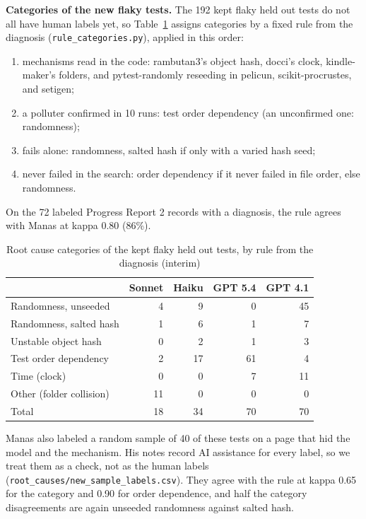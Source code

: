 \textbf{Categories of the new flaky tests.} The 192 kept flaky held out tests do not all have human labels yet, so Table~\ref{tab:rulecats} assigns categories by a fixed rule from the diagnosis (\texttt{rule\_categories.py}), applied in this order:
\begin{enumerate}
\item mechanisms read in the code: rambutan3's object hash, docci's clock, kindle-maker's folders, and pytest-randomly reseeding in pelicun, scikit-procrustes, and setigen;
\item a polluter confirmed in 10 runs: test order dependency (an unconfirmed one: randomness);
\item fails alone: randomness, salted hash if only with a varied hash seed;
\item never failed in the search: order dependency if it never failed in file order, else randomness.
\end{enumerate}
On the 72 labeled Progress Report 2 records with a diagnosis, the rule agrees with Manas at kappa 0.80 (86\%).

\begin{table}[htbp]
\caption{Root cause categories of the kept flaky held out tests, by rule from the diagnosis (interim)}
\label{tab:rulecats}
\small
\setlength{\tabcolsep}{3pt}
\begin{tabular}{lrrrr}
\toprule
 & Sonnet & Haiku & GPT 5.4 & GPT 4.1 \\
\midrule
Randomness, unseeded & 4 & 9 & 0 & 45 \\
Randomness, salted hash & 1 & 6 & 1 & 7 \\
Unstable object hash & 0 & 2 & 1 & 3 \\
Test order dependency & 2 & 17 & 61 & 4 \\
Time (clock) & 0 & 0 & 7 & 11 \\
Other (folder collision) & 11 & 0 & 0 & 0 \\
\midrule
Total & 18 & 34 & 70 & 70 \\
\bottomrule
\end{tabular}
\end{table}

Manas also labeled a random sample of 40 of these tests on a page that hid the model and the mechanism. His notes record AI assistance for every label, so we treat them as a check, not as the human labels (\texttt{root\_causes/new\_sample\_labels.csv}). They agree with the rule at kappa 0.65 for the category and 0.90 for order dependence, and half the category disagreements are again unseeded randomness against salted hash.

